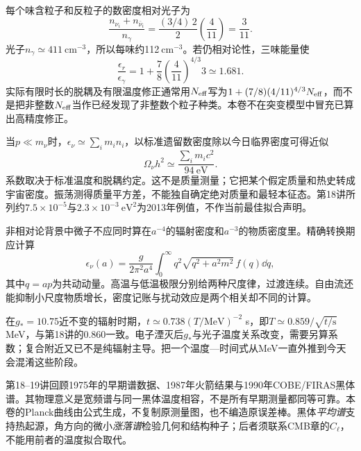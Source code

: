 每个味含粒子和反粒子的数密度相对光子为
\[
 \frac{n_{\nu_i}+n_{\bar\nu_i}}{n_\gamma}
 =\frac{(3/4)\,2}{2}\left(\frac4{11}\right)=\frac3{11}.
\]
光子$n_\gamma\simeq411\ \mathrm{cm^{-3}}$，所以每味约112$\ \mathrm{cm^{-3}}$。若仍相对论性，三味能量使
\[
 \frac{\epsilon_r}{\epsilon_\gamma}
 =1+\frac78\left(\frac4{11}\right)^{4/3}3\simeq1.681.
\]
实际有限时长的脱耦及有限温度修正通常用$N_{\rm eff}$写为$1+(7/8)(4/11)^{4/3}N_{\rm eff}$，而不是把非整数$N_{\rm eff}$当作已经发现了非整数个粒子种类。本卷不在突变模型中冒充已算出高精度修正。

当$p\ll m_\nu$时，$\epsilon_\nu\simeq\sum_i m_i n_i$，以标准遗留数密度除以今日临界密度可得近似
\[
 \Omega_\nu h^2\simeq\frac{\sum_i m_ic^2}{94\ \mathrm{eV}}.
\]
系数取决于标准温度和脱耦约定。这不是质量测量；它把某个假定质量和热史转成宇宙密度。振荡测得质量平方差，不能独自确定绝对质量和最轻本征态。第18讲所列约$7.5\times10^{-5}$与$2.3\times10^{-3}\ \mathrm{eV^2}$为2013年例值，不作当前最佳拟合声明。

非相对论背景中微子不应同时算在$a^{-4}$的辐射密度和$a^{-3}$的物质密度里。精确转换期应计算
\[
 \epsilon_\nu(a)=\frac{g}{2\pi^2a^4}\int_0^\infty
 q^2\sqrt{q^2+a^2m^2}\,f(q)\dd q,
\]
其中$q=ap$为共动动量。高温与低温极限分别给两种尺度律，过渡连续。自由流还能抑制小尺度物质增长，密度记账与扰动效应是两个相关却不同的计算。

在$g_*=10.75$近不变的辐射时期，$t\simeq0.738(T/\mathrm{MeV})^{-2}$ s，即$T\simeq0.859/\sqrt{t/\mathrm s}$ MeV，与第18讲的0.860一致。电子湮灭后$g_*$与光子温度关系改变，需要另算系数；复合附近又已不是纯辐射主导。把一个温度—时间式从MeV一直外推到今天会混淆这些阶段。

第18--19讲回顾1975年的早期谱数据、1987年火箭结果与1990年COBE/FIRAS黑体谱。其物理意义是宽频谱与同一黑体温度相容，不是所有早期测量都同等可靠。本卷的Planck曲线由公式生成，不复制原测量图，也不编造原误差棒。黑体\emph{平均谱}支持热起源，角方向的微小\emph{涨落谱}检验几何和结构种子；后者须联系CMB章的$C_\ell$，不能用前者的温度拟合取代。
